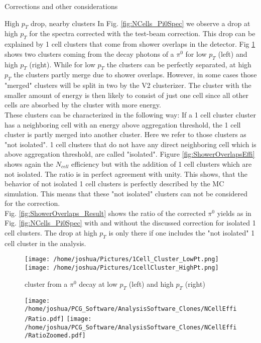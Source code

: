 \documentclass[ALICE]{ALICE_analysis_notes}
\begin{document}
\begin{section}{Corrections and other considerations}
\begin{subsection}{High $p_{T}$ drop, nearby clusters}
\label{sec:neighbors}
In Fig. \ref{fig:NCells_Pi0Spec} we observe a drop at high $p_{T}$ for the spectra corrected with the test-beam correction. This drop can be explained by 1 cell clusters that come from shower overlaps in the detector. Fig \ref{fig:ShowerOverlaps} shows two clusters coming from the decay photons of a $\pi^{0}$ for low $p_{T}$ (left) and high $p_{T}$ (right). While for low $p_{T}$ the clusters can be perfectly separated, at high $p_{T}$ the clusters partly merge due to shower overlaps. However, in some cases those "merged" clusters will be split in two by the V2 clusterizer. The cluster with the smaller amount of energy is then likely to consist of just one cell since all other cells are absorbed by the cluster with more energy. \\
These clusters can be characterized in the following way: If a 1 cell cluster cluster has a neighboring cell with an energy above aggregation threshold, the 1 cell cluster is partly merged into another cluster. Here we refer to those clusters as "not isolated". 1 cell clusters that do not have any direct neighboring cell which is above aggregation threshold, are called "isolated".
Figure \ref{fig:ShowerOverlapsEffi} shows again the $N_{cell}$ efficiency but with the addition of 1 cell clusters which are not isolated. The ratio is in perfect agreement with unity. This shows, that the behavior of not isolated 1 cell clusters is perfectly described by the MC simulation. This means that these "not isolated" clusters can not be considered for the correction. \\
Fig. \ref{fig:ShowerOverlaps_Result} shows the ratio of the corrected $\pi^{0}$ yields as in Fig. \ref{fig:NCells_Pi0Spec} with and without the discussed correction for isolated 1 cell clusters. The drop at high $p_{T}$ is only there if one includes the "not isolated" 1 cell cluster in the analysis. 

\begin{figure}[ht!]
	\centering
	\texttt{[image: /home/joshua/Pictures/1Cell\_Cluster\_LowPt.png]}
	\texttt{[image: /home/joshua/Pictures/1cellCluster\_HighPt.png]}
	
	\caption{ cluster from a $\pi^{0}$ decay at low $p_{T}$ (left) and high $p_{T}$ (right)}
	\label{fig:ShowerOverlaps}
\end{figure}



\begin{figure}[ht!]
	\centering
	\texttt{[image: /home/joshua/PCG\_Software/AnalysisSoftware\_Clones/NCellEffi/Ratio.pdf]}
	\texttt{[image: /home/joshua/PCG\_Software/AnalysisSoftware\_Clones/NCellEffi/RatioZoomed.pdf]}
	

\end{figure}
\end{subsection}
\end{section}
\end{document}
